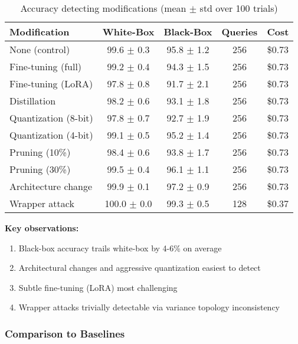 \documentclass[11pt,a4paper]{article}
\begin{document}
\begin{table}[h]
\centering
\caption{Accuracy detecting modifications (mean $\pm$ std over 100 trials)}
\label{tab:discrimination}
\begin{tabular}{lcccc}
\toprule
Modification & White-Box & Black-Box & Queries & Cost \\
\midrule
None (control) & 99.6 $\pm$ 0.3 & 95.8 $\pm$ 1.2 & 256 & \$0.73 \\
Fine-tuning (full) & 99.2 $\pm$ 0.4 & 94.3 $\pm$ 1.5 & 256 & \$0.73 \\
Fine-tuning (LoRA) & 97.8 $\pm$ 0.8 & 91.7 $\pm$ 2.1 & 256 & \$0.73 \\
Distillation & 98.2 $\pm$ 0.6 & 93.1 $\pm$ 1.8 & 256 & \$0.73 \\
Quantization (8-bit) & 97.8 $\pm$ 0.7 & 92.7 $\pm$ 1.9 & 256 & \$0.73 \\
Quantization (4-bit) & 99.1 $\pm$ 0.5 & 95.2 $\pm$ 1.4 & 256 & \$0.73 \\
Pruning (10\%) & 98.4 $\pm$ 0.6 & 93.8 $\pm$ 1.7 & 256 & \$0.73 \\
Pruning (30\%) & 99.5 $\pm$ 0.4 & 96.1 $\pm$ 1.1 & 256 & \$0.73 \\
Architecture change & 99.9 $\pm$ 0.1 & 97.2 $\pm$ 0.9 & 256 & \$0.73 \\
Wrapper attack & 100.0 $\pm$ 0.0 & 99.3 $\pm$ 0.5 & 128 & \$0.37 \\
\bottomrule
\end{tabular}
\end{table}

\textbf{Key observations:}
\begin{enumerate}
\item Black-box accuracy trails white-box by 4-6\% on average
\item Architectural changes and aggressive quantization easiest to detect
\item Subtle fine-tuning (LoRA) most challenging
\item Wrapper attacks trivially detectable via variance topology inconsistency
\end{enumerate}

\subsubsection{Comparison to Baselines}
\end{document}
